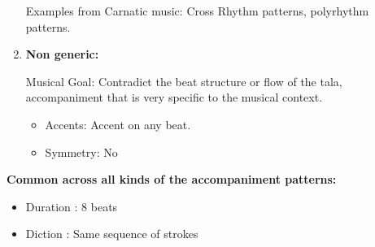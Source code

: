 \begin{enumerate}
Examples from Carnatic music: Cross Rhythm patterns, polyrhythm patterns.

\item \textbf{Non generic:}

Musical Goal: Contradict the beat structure or flow of the tala, accompaniment that is very specific to the musical context.

\begin{itemize}
\item Accents:  Accent on any beat.
\item Symmetry: No
\end{itemize}

\end{enumerate}

\textbf{ Common across all kinds of the accompaniment patterns:}

\begin{itemize}
\item Duration : 8 beats
\item Diction : Same sequence of strokes
\end{itemize}
